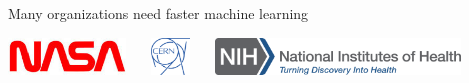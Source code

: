 \begin{frame}{Many organizations need faster machine learning}
\begin{itemize}
\vspace{0.05in}
\includegraphics[height=1cm]{img-presentation/nasa}~~~
\includegraphics[height=1cm]{img-presentation/cern}~~~
\includegraphics[height=1cm]{img-presentation/nih}

\end{itemize}

\end{frame}


